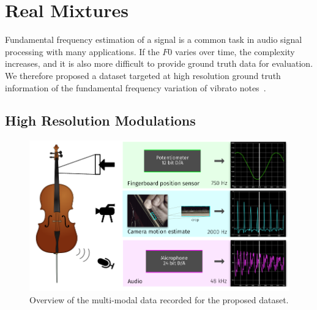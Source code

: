 
\section{Real Mixtures}

Fundamental frequency estimation of a signal is a common task in audio signal processing with many applications. 
If the $F0$ varies over time, the complexity increases, and it is also more difficult to provide ground truth data for evaluation.
We therefore proposed a dataset targeted at high resolution ground truth information of the fundamental frequency variation of vibrato notes~\cite{stoeter15acm}.

\subsection{High Resolution Modulations}


\begin{figure}[h]
  \centering
  \includegraphics[width=\textwidth]{Chapters/04_Data/figures/teaser.pdf}
  \caption{Overview of the multi-modal data recorded for the proposed dataset.}
\label{fig:teaser}
\end{figure}

